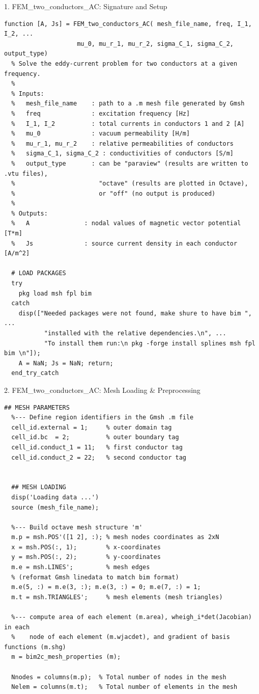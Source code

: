 \documentclass[aspectratio=54,xcolor=dvipsnames]{beamer}
\begin{document}
\begin{frame}[fragile]{1. FEM\_two\_conductors\_AC: Signature and Setup}
\small
\begin{lstlisting}
function [A, Js] = FEM_two_conductors_AC( mesh_file_name, freq, I_1, I_2, ...
                    mu_0, mu_r_1, mu_r_2, sigma_C_1, sigma_C_2, output_type)
  % Solve the eddy-current problem for two conductors at a given frequency.
  %
  % Inputs:
  %   mesh_file_name    : path to a .m mesh file generated by Gmsh
  %   freq              : excitation frequency [Hz]
  %   I_1, I_2          : total currents in conductors 1 and 2 [A]
  %   mu_0              : vacuum permeability [H/m]
  %   mu_r_1, mu_r_2    : relative permeabilities of conductors
  %   sigma_C_1, sigma_C_2 : conductivities of conductors [S/m]
  %   output_type       : can be "paraview" (results are written to .vtu files),
  %                       "octave" (results are plotted in Octave),
  %                       or "off" (no output is produced)
  %
  % Outputs:
  %   A               : nodal values of magnetic vector potential [T*m]
  %   Js              : source current density in each conductor [A/m^2]

  # LOAD PACKAGES
  try
    pkg load msh fpl bim
  catch
    disp(["Needed packages were not found, make shure to have bim ", ...
           "installed with the relative dependencies.\n", ...
           "To install them run:\n pkg -forge install splines msh fpl bim \n"]);
    A = NaN; Js = NaN; return;
  end_try_catch

\end{lstlisting}
\end{frame}

\begin{frame}[fragile]{2. FEM\_two\_conductors\_AC: Mesh Loading \& Preprocessing}
\scriptsize
\begin{lstlisting}[firstnumber=31]
  ## MESH PARAMETERS
  %--- Define region identifiers in the Gmsh .m file
  cell_id.external = 1;     % outer domain tag
  cell_id.bc  = 2;          % outer boundary tag
  cell_id.conduct_1 = 11;   % first conductor tag
  cell_id.conduct_2 = 22;   % second conductor tag


  ## MESH LOADING
  disp('Loading data ...')
  source (mesh_file_name);

  %--- Build octave mesh structure 'm'
  m.p = msh.POS'([1 2], :); % mesh nodes coordinates as 2xN
  x = msh.POS(:, 1);        % x-coordinates
  y = msh.POS(:, 2);        % y-coordinates
  m.e = msh.LINES';         % mesh edges
  % (reformat Gmsh linedata to match bim format)
  m.e(5, :) = m.e(3, :); m.e(3, :) = 0; m.e(7, :) = 1;
  m.t = msh.TRIANGLES';     % mesh elements (mesh triangles)

  %--- compute area of each element (m.area), wheigh_i*det(Jacobian) in each 
  %    node of each element (m.wjacdet), and gradient of basis functions (m.shg)
  m = bim2c_mesh_properties (m);

  Nnodes = columns(m.p);  % Total number of nodes in the mesh
  Nelem = columns(m.t);   % Total number of elements in the mesh
  
\end{lstlisting}
\end{frame}
\end{document}
